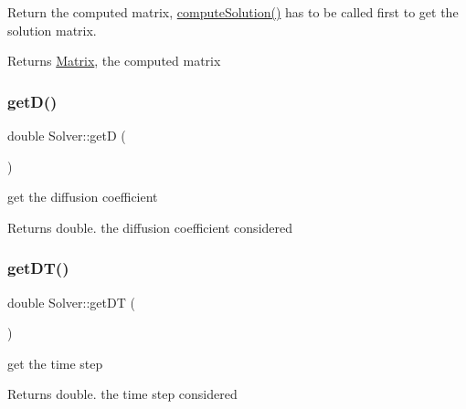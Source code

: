 Return the computed matrix, \mbox{\hyperlink{classSolver_a0f4ecfaed825407019995b5176e25748}{compute\+Solution()}} has to be called first to get the solution matrix. \begin{DoxyReturn}{Returns}
\mbox{\hyperlink{classMatrix}{Matrix}}, the computed matrix 
\end{DoxyReturn}
\mbox{\label{classSolver_a3b4da24979dd1c316c860749bbf6e3af}} 
\subsubsection{\texorpdfstring{get\+D()}{getD()}}
{\footnotesize\ttfamily double Solver\+::getD (\begin{DoxyParamCaption}{ }\end{DoxyParamCaption})}

get the diffusion coefficient
\begin{DoxyItemize}
\item \begin{DoxyReturn}{Returns}
double. the diffusion coefficient considered 
\end{DoxyReturn}

\end{DoxyItemize}\mbox{\label{classSolver_a560a332c3193d5709e1e5eb44bfaa322}} 
\subsubsection{\texorpdfstring{get\+D\+T()}{getDT()}}
{\footnotesize\ttfamily double Solver\+::get\+DT (\begin{DoxyParamCaption}{ }\end{DoxyParamCaption})}

get the time step
\begin{DoxyItemize}
\item \begin{DoxyReturn}{Returns}
double. the time step considered 
\end{DoxyReturn}

\end{DoxyItemize}\mbox{\label{classSolver_a6a05cda84ae4e3f3a187cf69f1407d81}} 
